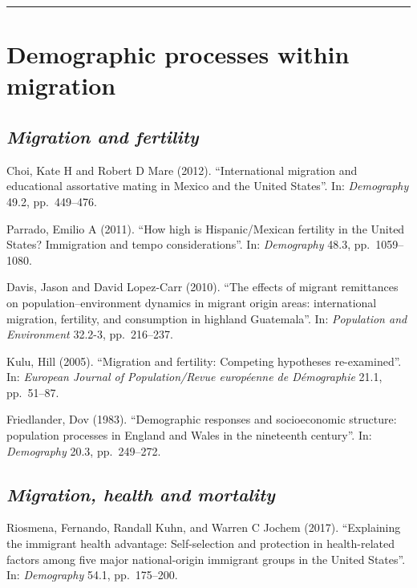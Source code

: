 \documentclass[
  12pt,
]{article}
\begin{document}
\begin{center}\rule{0.5\linewidth}{0.5pt}\end{center}

\hypertarget{demographic-processes-within-migration}{%
\section{\texorpdfstring{\textbf{Demographic processes within
migration}}{Demographic processes within migration}}\label{demographic-processes-within-migration}}

\hypertarget{migration-and-fertility}{%
\subsection{\texorpdfstring{\emph{Migration and
fertility}}{Migration and fertility}}\label{migration-and-fertility}}

Choi, Kate H and Robert D Mare (2012). ``International migration and
educational assortative mating in Mexico and the United States''. In:
\emph{Demography} 49.2, pp.~449--476.

Parrado, Emilio A (2011). ``How high is Hispanic/Mexican fertility in
the United States? Immigration and tempo considerations''. In:
\emph{Demography} 48.3, pp.~1059--1080.

Davis, Jason and David Lopez-Carr (2010). ``The effects of migrant
remittances on population--environment dynamics in migrant origin areas:
international migration, fertility, and consumption in highland
Guatemala''. In: \emph{Population and Environment} 32.2-3, pp.~216--237.

Kulu, Hill (2005). ``Migration and fertility: Competing hypotheses
re-examined''. In:
\emph{European Journal of Population/Revue européenne de Démographie}
21.1, pp.~51--87.

Friedlander, Dov (1983). ``Demographic responses and socioeconomic
structure: population processes in England and Wales in the nineteenth
century''. In: \emph{Demography} 20.3, pp.~249--272.

\hypertarget{migration-health-and-mortality}{%
\subsection{\texorpdfstring{\emph{Migration, health and
mortality}}{Migration, health and mortality}}\label{migration-health-and-mortality}}

Riosmena, Fernando, Randall Kuhn, and Warren C Jochem (2017).
``Explaining the immigrant health advantage: Self-selection and
protection in health-related factors among five major national-origin
immigrant groups in the United States''. In: \emph{Demography} 54.1,
pp.~175--200.
\end{document}
